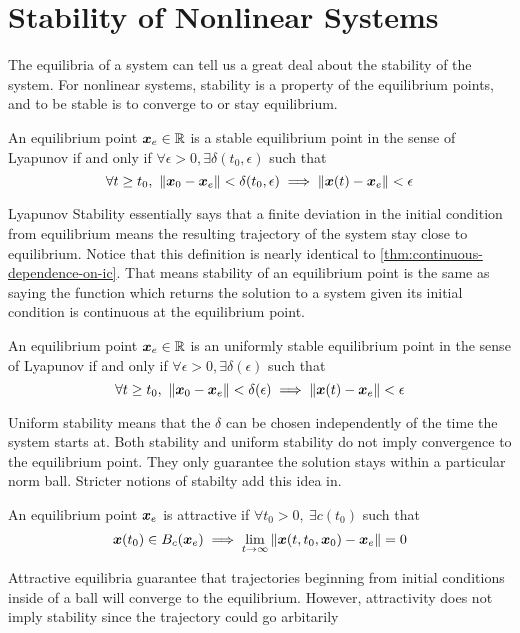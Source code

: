 \section{Stability of Nonlinear Systems}
The equilibria of a system can tell us a great deal about the stability of the
system. For nonlinear systems, stability is a property of the equilibrium
points, and to be stable is to converge to or stay equilibrium.
\begin{definition}
	An equilibrium point $\boldsymbol{x}_e\in \mathbb{R}$ is a stable equilibrium point in the
	sense of Lyapunov if and only if $\forall \epsilon > 0,\exists \delta(t_0,
	\epsilon)$ such that \[
		\forall t \geq t_0,\ \|\boldsymbol{x}_0 - \boldsymbol{x}_e\| < \delta(t_0, \epsilon)
		\implies \|\boldsymbol{x}(t) - \boldsymbol{x}_e\| < \epsilon
	\]
	\label{defn:stability}
\end{definition}
Lyapunov Stability essentially says that a finite deviation in the initial
condition from equilibrium means the resulting trajectory of the system stay close to
equilibrium. Notice that this definition is nearly identical to
\cref{thm:continuous-dependence-on-ic}. That means stability of an equilibrium
point is the same as saying the function which returns the solution to a system
given its initial condition is continuous at the equilibrium point.
\begin{definition}
	An equilibrium point $\boldsymbol{x}_e\in \mathbb{R}$ is an uniformly stable equilibrium point in the
	sense of Lyapunov if and only if $\forall \epsilon > 0,\exists \delta(
	\epsilon)$ such that \[
		\forall t \geq t_0,\ \|\boldsymbol{x}_0 - \boldsymbol{x}_e\| < \delta(\epsilon)
		\implies \|\boldsymbol{x}(t) - \boldsymbol{x}_e\| < \epsilon
	\]
	\label{defn:uniformly-stable}
\end{definition}
Uniform stability means that the $\delta$ can be chosen independently of the
time the system starts at.
Both stability and uniform stability do not imply convergence to the equilibrium
point. They only guarantee the solution stays within a particular norm ball.
Stricter notions of stabilty add this idea in.
\begin{definition}
	An equilibrium point $\boldsymbol{x}_e$ is attractive if $\forall t_0 > 0,\ \exists
	c(t_0)$ such that \[
		\boldsymbol{x}(t_0) \in B_c(\boldsymbol{x}_e) \implies \lim_{t\to\infty} \|\boldsymbol{x}(t, t_0,
		\boldsymbol{x}_0) - \boldsymbol{x}_e\| = 0
	\]
	\label{defn:attractivity}
\end{definition}
Attractive equilibria guarantee that trajectories beginning from initial
conditions inside of a ball will converge to the equilibrium. However,
attractivity does not imply stability since the trajectory could go arbitarily
